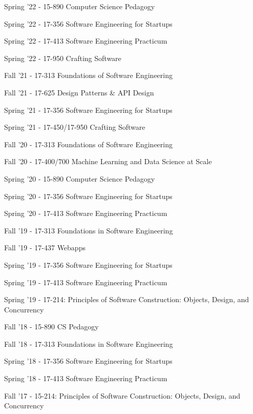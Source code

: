 \documentclass[10pt]{article}
\begin{document}
\begin{outerlist}
\begin{innerlist}
	\item Spring '22 - 15-890 Computer Science Pedagogy
	\item Spring '22 -  17-356 Software Engineering for Startups 
	\item Spring '22 - 17-413 Software Engineering Practicum
	\item Spring '22 - 17-950 Crafting Software
            \item Fall '21 - 17-313  Foundations of Software Engineering
            \item Fall '21 - 17-625  Design Patterns \& API Design
            \item Spring '21 - 17-356 Software Engineering for Startups
            \item Spring '21 - 17-450/17-950 Crafting Software
            \item Fall '20 - 17-313  Foundations of Software Engineering
            \item Fall '20 - 17-400/700 Machine Learning and Data Science at Scale
            \item Spring '20 - 15-890 Computer Science Pedagogy
            \item Spring '20 - 17-356 Software Engineering for Startups
            \item Spring '20 - 17-413 Software Engineering Practicum
            \item Fall '19 - 17-313 Foundations in Software Engineering 
            \item Fall '19 - 17-437 Webapps
             \item Spring '19 - 17-356 Software Engineering for Startups 
              \item Spring '19 - 17-413 Software Engineering Practicum
            \item Spring '19 - 17-214: Principles of Software Construction: Objects, Design, and Concurrency
            \item Fall '18 - 15-890 CS Pedagogy
            \item Fall '18 - 17-313 Foundations in Software Engineering 
             \item Spring '18 - 17-356 Software Engineering for Startups 
              \item Spring '18 - 17-413 Software Engineering Practicum
             \item Fall '17 - 15-214: Principles of Software Construction: Objects, Design, and Concurrency
\end{innerlist}




\end{outerlist}
\end{document}
